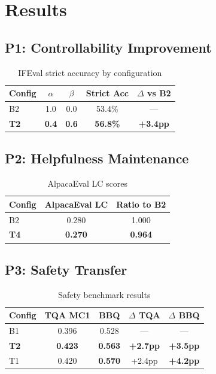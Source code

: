\section{Results}
\label{sec:results}

\subsection{P1: Controllability Improvement}

\begin{table}[h]
\centering
\caption{IFEval strict accuracy by configuration}
\label{tab:p1_results}
\begin{tabular}{lcccc}
\toprule
Config & $\alpha$ & $\beta$ & Strict Acc & $\Delta$ vs B2 \\
\midrule
B2 & 1.0 & 0.0 & 53.4\% & --- \\
\textbf{T2} & \textbf{0.4} & \textbf{0.6} & \textbf{56.8\%} & \textbf{+3.4pp} \\
\bottomrule
\end{tabular}
\end{table}

\subsection{P2: Helpfulness Maintenance}

\begin{table}[h]
\centering
\caption{AlpacaEval LC scores}
\label{tab:p2_results}
\begin{tabular}{lcc}
\toprule
Config & AlpacaEval LC & Ratio to B2 \\
\midrule
B2 & 0.280 & 1.000 \\
\textbf{T4} & \textbf{0.270} & \textbf{0.964} \\
\bottomrule
\end{tabular}
\end{table}

\subsection{P3: Safety Transfer}

\begin{table}[h]
\centering
\caption{Safety benchmark results}
\label{tab:p3_results}
\begin{tabular}{lcccc}
\toprule
Config & TQA MC1 & BBQ & $\Delta$ TQA & $\Delta$ BBQ \\
\midrule
B1 & 0.396 & 0.528 & --- & --- \\
\textbf{T2} & \textbf{0.423} & \textbf{0.563} & \textbf{+2.7pp} & \textbf{+3.5pp} \\
T1 & 0.420 & \textbf{0.570} & +2.4pp & \textbf{+4.2pp} \\
\bottomrule
\end{tabular}
\end{table}

